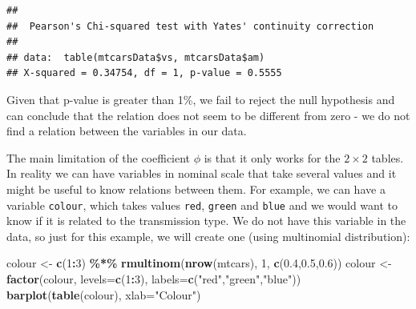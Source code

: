 \documentclass[
]{book}
\newenvironment{Shaded}{\begin{snugshade}}{\end{snugshade}}
\newcommand{\AttributeTok}[1]{\textcolor[rgb]{0.13,0.29,0.53}{#1}}
\newcommand{\DecValTok}[1]{\textcolor[rgb]{0.00,0.00,0.81}{#1}}
\newcommand{\FloatTok}[1]{\textcolor[rgb]{0.00,0.00,0.81}{#1}}
\newcommand{\FunctionTok}[1]{\textcolor[rgb]{0.13,0.29,0.53}{\textbf{#1}}}
\newcommand{\NormalTok}[1]{#1}
\newcommand{\OtherTok}[1]{\textcolor[rgb]{0.56,0.35,0.01}{#1}}
\newcommand{\SpecialCharTok}[1]{\textcolor[rgb]{0.81,0.36,0.00}{\textbf{#1}}}
\newcommand{\StringTok}[1]{\textcolor[rgb]{0.31,0.60,0.02}{#1}}
\theoremstyle{definition}
\theoremstyle{definition}
\theoremstyle{definition}
\theoremstyle{definition}
\theoremstyle{remark}
\begin{document}
\begin{Shaded}
\end{Shaded}

\begin{verbatim}
## 
##  Pearson's Chi-squared test with Yates' continuity correction
## 
## data:  table(mtcarsData$vs, mtcarsData$am)
## X-squared = 0.34754, df = 1, p-value = 0.5555
\end{verbatim}

Given that p-value is greater than 1\%, we fail to reject the null hypothesis and can conclude that the relation does not seem to be different from zero - we do not find a relation between the variables in our data.

The main limitation of the coefficient \(\phi\) is that it only works for the \(2\times 2\) tables. In reality we can have variables in nominal scale that take several values and it might be useful to know relations between them. For example, we can have a variable \texttt{colour}, which takes values \texttt{red}, \texttt{green} and \texttt{blue} and we would want to know if it is related to the transmission type. We do not have this variable in the data, so just for this example, we will create one (using multinomial distribution):

\begin{Shaded}
\begin{Highlighting}[]
\NormalTok{colour }\OtherTok{\textless{}{-}} \FunctionTok{c}\NormalTok{(}\DecValTok{1}\SpecialCharTok{:}\DecValTok{3}\NormalTok{) }\SpecialCharTok{\%*\%} \FunctionTok{rmultinom}\NormalTok{(}\FunctionTok{nrow}\NormalTok{(mtcars), }\DecValTok{1}\NormalTok{,}
                               \FunctionTok{c}\NormalTok{(}\FloatTok{0.4}\NormalTok{,}\FloatTok{0.5}\NormalTok{,}\FloatTok{0.6}\NormalTok{))}
\NormalTok{colour }\OtherTok{\textless{}{-}} \FunctionTok{factor}\NormalTok{(colour, }\AttributeTok{levels=}\FunctionTok{c}\NormalTok{(}\DecValTok{1}\SpecialCharTok{:}\DecValTok{3}\NormalTok{),}
                 \AttributeTok{labels=}\FunctionTok{c}\NormalTok{(}\StringTok{"red"}\NormalTok{,}\StringTok{"green"}\NormalTok{,}\StringTok{"blue"}\NormalTok{))}
\FunctionTok{barplot}\NormalTok{(}\FunctionTok{table}\NormalTok{(colour), }\AttributeTok{xlab=}\StringTok{"Colour"}\NormalTok{)}
\end{Highlighting}
\end{Shaded}
\end{document}
